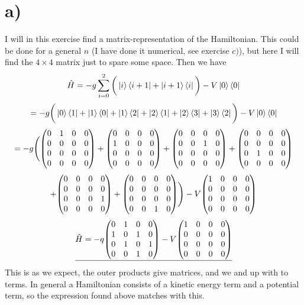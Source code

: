 \documentclass{scrartcl}
\begin{document}
\section*{a)}
I will in this exercise find a matrix-representation of the Hamiltonian. This could be done for a general $n$ (I have done it numerical, see exercise $c)$), but here I will find the $4\times 4$ matrix just to spare some space. Then we have
$$\hat{H}=-g\sum_{i=0}^2\bigg(\ket{i}\bra{i+1}+\ket{i+1}\bra{i}\bigg)-V\ket{0}\bra{0}$$
$$=-g\bigg(\ket{0}\bra{1}+\ket{1}\bra{0}+\ket{1}\bra{2}
   +\ket{2}\bra{1}+\ket{2}\bra{3}+\ket{3}\bra{2}\bigg)-V\ket{0}\bra{0}$$
$$=-g\Bigg(\mqty(0&1&0&0\\0&0&0&0\\0&0&0&0\\0&0&0&0)
          +\mqty(0&0&0&0\\1&0&0&0\\0&0&0&0\\0&0&0&0)
          +\mqty(0&0&0&0\\0&0&1&0\\0&0&0&0\\0&0&0&0)
          +\mqty(0&0&0&0\\0&0&0&0\\0&1&0&0\\0&0&0&0)$$
        $$+\mqty(0&0&0&0\\0&0&0&0\\0&0&0&1\\0&0&0&0)
          +\mqty(0&0&0&0\\0&0&0&0\\0&0&0&0\\0&0&1&0)\Bigg)
          -V\mqty(1&0&0&0\\0&0&0&0\\0&0&0&0\\0&0&0&0)$$
$$\underline{\hat{H}=-q\mqty(0&1&0&0\\1&0&1&0\\0&1&0&1\\0&0&1&0)-V\mqty(1&0&0&0\\0&0&0&0\\0&0&0&0\\0&0&0&0)}$$
This is as we expect, the outer products give matrices, and we and up with to terms. In general a Hamiltonian consists of a kinetic energy term and a potential term, so the expression found above matches with this.
\end{document}
